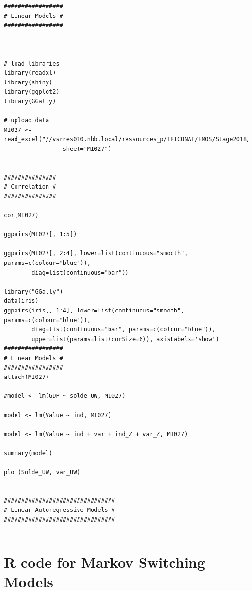 \documentclass[12pt,a4paper,oneside]{book}
\begin{document}
\begin{lstlisting}
#################
# Linear Models #
#################



# load libraries
library(readxl)
library(shiny)
library(ggplot2)
library(GGally)

# upload data
MI027 <- read_excel("//vsrres010.nbb.local/ressources_p/TRICONAT/EMOS/Stage2018/Datasets/RS_975.xlsx",
                 sheet="MI027")


###############
# Correlation #
###############

cor(MI027)

ggpairs(MI027[, 1:5])

ggpairs(MI027[, 2:4], lower=list(continuous="smooth", params=c(colour="blue")),
        diag=list(continuous="bar"))

library("GGally")
data(iris)
ggpairs(iris[, 1:4], lower=list(continuous="smooth", params=c(colour="blue")),
        diag=list(continuous="bar", params=c(colour="blue")), 
        upper=list(params=list(corSize=6)), axisLabels='show')
#################
# Linear Models #
#################
attach(MI027)

#model <- lm(GDP ~ solde_UW, MI027)

model <- lm(Value ~ ind, MI027)

model <- lm(Value ~ ind + var + ind_Z + var_Z, MI027)

summary(model)

plot(Solde_UW, var_UW)


################################
# Linear Autoregressive Models #
################################


\end{lstlisting}








\newpage
\section*{R code for Markov Switching Models}
\end{document}
